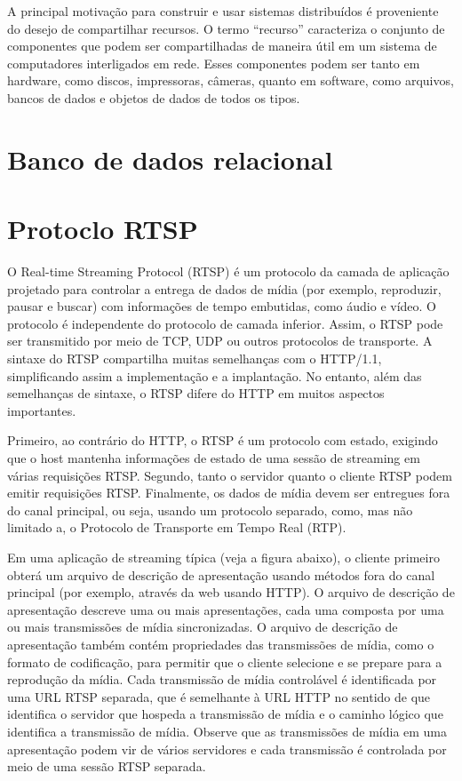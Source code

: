 \documentclass[12pt, %
openright, 
oneside, %
a4paper,    %
brazil]{facom-ufu-abntex2}
\begin{document}
A principal motivação para construir e usar sistemas distribuídos é proveniente
do desejo de compartilhar recursos. O termo “recurso” caracteriza o conjunto de
componentes que podem ser compartilhadas de maneira útil em um sistema de
computadores interligados em rede. Esses componentes podem ser tanto em
hardware, como discos, impressoras, câmeras, quanto em software, como arquivos,
bancos de dados e objetos de dados de todos os tipos. \cite{coulouris2013sistemas}


\section{Banco de dados relacional}

\section{Protoclo RTSP}

O Real-time Streaming Protocol (RTSP) é um protocolo da camada de aplicação
projetado para controlar a entrega de dados de mídia (por exemplo, reproduzir,
pausar e buscar) com informações de tempo embutidas, como áudio e vídeo. O
protocolo é independente do protocolo de camada inferior. Assim, o RTSP pode
ser transmitido por meio de TCP, UDP ou outros protocolos de transporte. A
sintaxe do RTSP compartilha muitas semelhanças com o HTTP/1.1, simplificando
assim a implementação e a implantação. No entanto, além das semelhanças de
sintaxe, o RTSP difere do HTTP em muitos aspectos importantes.

Primeiro, ao contrário do HTTP, o RTSP é um protocolo com estado, exigindo que
o host mantenha informações de estado de uma sessão de streaming em várias
requisições RTSP. Segundo, tanto o servidor quanto o cliente RTSP podem emitir
requisições RTSP. Finalmente, os dados de mídia devem ser entregues fora do
canal principal, ou seja, usando um protocolo separado, como, mas não limitado
a, o Protocolo de Transporte em Tempo Real (RTP).

Em uma aplicação de streaming típica (veja a figura abaixo), o cliente primeiro
obterá um arquivo de descrição de apresentação usando métodos fora do canal
principal (por exemplo, através da web usando HTTP). O arquivo de descrição de
apresentação descreve uma ou mais apresentações, cada uma composta por uma ou
mais transmissões de mídia sincronizadas. O arquivo de descrição de
apresentação também contém propriedades das transmissões de mídia, como o
formato de codificação, para permitir que o cliente selecione e se prepare para
a reprodução da mídia. Cada transmissão de mídia controlável é identificada por
uma URL RTSP separada, que é semelhante à URL HTTP no sentido de que identifica
o servidor que hospeda a transmissão de mídia e o caminho lógico que identifica
a transmissão de mídia. Observe que as transmissões de mídia em uma
apresentação podem vir de vários servidores e cada transmissão é controlada por
meio de uma sessão RTSP separada. \cite{rfc2326}
\end{document}
